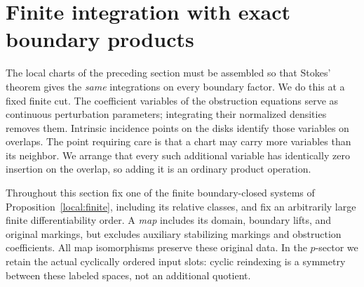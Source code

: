 \section{Finite integration with exact boundary products}
\label{virt:section}

The local charts of the preceding section must be assembled so that Stokes'
theorem gives the \emph{same} integrations on every boundary factor.  We do
this at a fixed finite cut.  The coefficient variables of the obstruction
equations serve as continuous perturbation parameters; integrating their
normalized densities removes them.  Intrinsic incidence points on the
disks identify those variables on overlaps.  The point requiring care is
that a chart may carry more variables than its neighbor.  We arrange that
every such additional variable has identically zero insertion on the
overlap, so adding it is an ordinary product operation.

Throughout this section fix one of the finite boundary-closed systems of
Proposition~\ref{local:finite}, including its relative classes, and fix an
arbitrarily large finite differentiability order.  A \emph{map} includes
its domain, boundary lifts, and original markings, but excludes auxiliary
stabilizing markings and obstruction coefficients.  All map isomorphisms
preserve these original data.  In the $p$-sector we retain the actual
cyclically ordered input slots: cyclic reindexing is a symmetry between
these labeled spaces, not an additional quotient.

